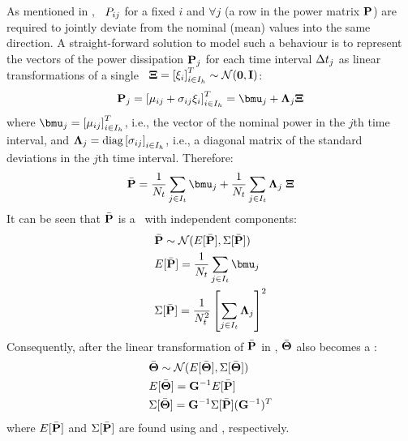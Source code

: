 As mentioned in , \rvs\ $P_{ij}$ for a fixed $i$ and $\forall j$ (a row in the power matrix $\mathbf{P}$) are required to jointly deviate from the nominal (mean) values into the same direction. A straight-forward solution to model such a behaviour is to represent the vectors of the power dissipation $\mathbf{P}_j$ for each time interval $\Delta t_j$ as linear transformations of a single \msnrv\ $\mathbf{\Xi} = \left[\xi_i\right]^T_{i \in I_h} \sim \mathcal{N}(\mathbf{0}, \mathbf{I})$:
\begin{equation} \equlabel{power-rv}
  \vpower_j = \vector{\mean{ij} + \deviation{ij} \stdnormal_i}_{i \in \nodeindex} = \vmean{j} + \ddeviation{j} \vstdnormal
\end{equation}
where $\vmean{j} = \vector{\mean{ij}}_{i \in \nodeindex}$, i.e., the vector of the nominal power in the $j$th time interval, and $\mathbf{\Lambda}_{j} = \text{diag}\left[\sigma_{ij}\right]_{i \in I_h}$, i.e., a diagonal matrix of the standard deviations in the $j$th time interval. Therefore:
\[
  \a{\vpower} = \frac{1}{\stepcount} \sum_{j \in \timeindex} \vmean{j} + \frac{1}{\stepcount} \sum_{j \in \timeindex} \ddeviation{j} \; \vstdnormal
\]
It can be seen that $\bar{\mathbf{P}}$ is a \mnrv\ with independent components:
\begin{align}
  & \a{\vpower} \sim \normal(\expectation{\a{\vpower}}, \covariance{\a{\vpower}}) \nonumber \\
  & \expectation{\a{\vpower}} = \frac{1}{\stepcount} \sum_{j \in \timeindex} \vmean{j} \equlabel{steady-power-mean} \\
  & \covariance{\a{\vpower}} = \frac{1}{\stepcount^2} \left[ \sum_{j \in \timeindex} \ddeviation{j} \right]^2 \equlabel{steady-power-covariance}
\end{align}
Consequently, after the linear transformation of $\bar{\mathbf{P}}$ in , $\bar{\mathbf{\Theta}}$ also becomes a \mnrv:
\begin{align*}
  & \bar{\mathbf{\Theta}} \sim \mathcal{N}(E[\bar{\mathbf{\Theta}}], \Sigma[\bar{\mathbf{\Theta}}]) \\
  & E[\bar{\mathbf{\Theta}}] = \mathbf{G}^{-1} E[\bar{\mathbf{P}}] \\
  & \Sigma[\bar{\mathbf{\Theta}}] = \mathbf{G}^{-1} \Sigma[\bar{\mathbf{P}}] (\mathbf{G}^{-1})^T
\end{align*}
where $E[\bar{\mathbf{P}}]$ and $\Sigma[\bar{\mathbf{P}}]$ are found using  and , respectively.
